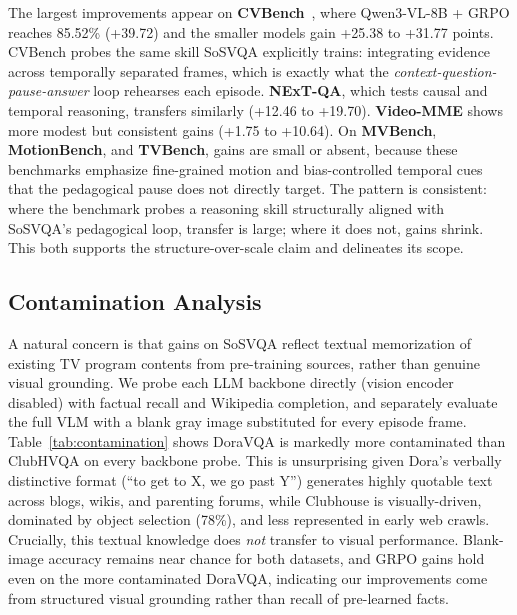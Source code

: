 \documentclass{article}
\newcommand{\com}[1]{\textcolor{red}{#1}}
\begin{document}
The largest improvements appear on \textbf{CVBench}~\cite{zhu2025cvbench}, where Qwen3-VL-8B + GRPO reaches 85.52\% (+39.72) and the smaller models gain +25.38 to +31.77 points. CVBench probes the same skill SoSVQA explicitly trains: integrating evidence across temporally separated frames, which is exactly what the \textit{context-question-pause-answer} loop rehearses each episode. \textbf{NExT-QA}, which tests causal and temporal reasoning, transfers similarly (+12.46 to +19.70). \textbf{Video-MME} shows more modest but consistent gains (+1.75 to +10.64). On \textbf{MVBench}, \textbf{MotionBench}, and \textbf{TVBench}, gains are small or absent, because these benchmarks emphasize fine-grained motion and bias-controlled temporal cues that the pedagogical pause does not directly target. The pattern is consistent: where the benchmark probes a reasoning skill structurally aligned with SoSVQA's pedagogical loop, transfer is large; where it does not, gains shrink. This both supports the structure-over-scale claim and delineates its scope.

\contaminationtable
\subsection{Contamination Analysis}
A natural concern is that gains on SoSVQA reflect textual memorization of
existing TV program contents from
pre-training sources, rather than genuine visual grounding.
We probe each LLM backbone directly (vision encoder disabled) with factual
recall and Wikipedia completion, and separately evaluate the full VLM with a
blank gray image substituted for every episode frame.
Table~\ref{tab:contamination} shows DoraVQA is markedly more contaminated than
ClubHVQA on every backbone probe. This is unsurprising given Dora's verbally
distinctive format (``to get to X, we go past Y'') generates highly quotable
text across blogs, wikis, and parenting forums, while Clubhouse is
visually-driven, dominated by object selection (78\%), and less represented in
early web crawls.
Crucially, this textual knowledge does \emph{not} transfer to visual
performance. Blank-image accuracy remains near chance for both datasets, and
GRPO gains hold even on the more contaminated DoraVQA, indicating our
improvements come from structured visual grounding rather than recall of
pre-learned facts.
\ablationtrainingmethod
\end{document}
